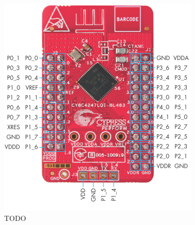 \begin{figure}[h]%
	\centering
    \includegraphics[width=\linewidth]{figures/cypress_psoc.PNG} %

    \caption[TODO]{TODO}

   \label{figuraCypressPeque}
\end{figure}

